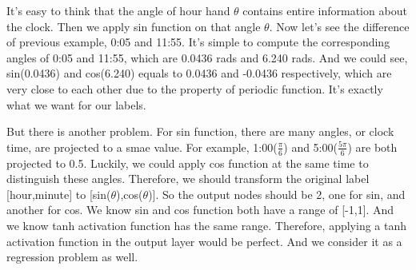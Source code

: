 \documentclass{article}
\begin{document}
It's easy to think that the angle of hour hand $\theta$ contains entire information about the clock. Then we apply sin function on that angle $\theta$. Now let's see the difference of previous example, 0:05 and 11:55. It's simple to compute the corresponding angles of 0:05 and 11:55, which are 0.0436 rads and 6.240 rads. And we could see, sin(0.0436) and cos(6.240) equals to 0.0436 and -0.0436 respectively, which are very close to each other due to the property of periodic function. It's exactly what we want for our labels.

But there is another problem. For sin function, there are many angles, or clock time, are projected to a smae value. For example, 1:00($\frac{\pi}{6}$) and 5:00($\frac{5\pi}{6}$) are both projected to 0.5. Luckily, we could apply cos function at the same time to distinguish these angles. Therefore, we should transform the original label [hour,minute] to [sin($\theta$),cos($\theta$)]. So the output nodes should be 2, one for sin, and another for cos. We know sin and cos function both have a range of [-1,1]. And we know tanh activation function has the same range. Therefore, applying a tanh activation function in the output layer would be perfect. And we consider it as a regression problem as well.
\end{document}
